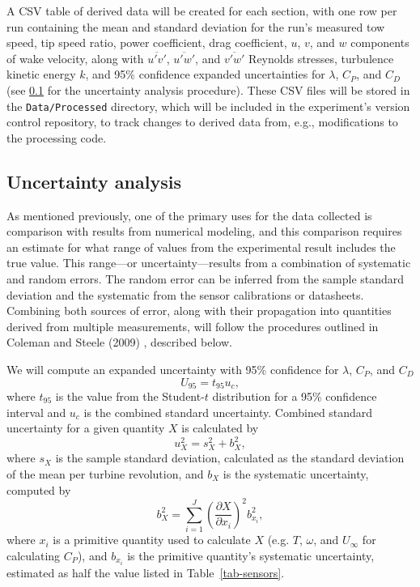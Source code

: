 \documentclass[12pt,letterpaper]{scrreprt}
\begin{document}
A CSV table of derived data will be created for each section, with one row per
run containing the mean and standard deviation for the run's measured tow speed,
tip speed ratio, power coefficient, drag coefficient, $u$, $v$, and $w$
components of wake velocity, along with $\overline{u'v'}$, $\overline{u'w'}$,
and $\overline{v'w'}$ Reynolds stresses, turbulence kinetic energy $k$, and 95\%
confidence expanded uncertainties for $\lambda$, $C_P$, and $C_D$ (see
\ref{heading-uncertainty} for the uncertainty analysis procedure). These CSV
files will be stored in the \texttt{Data/Processed} directory, which will be
included in the experiment's version control repository, to track changes to
derived data from, e.g., modifications to the processing code.

\subsection{Uncertainty analysis}\label{heading-uncertainty}

As mentioned previously, one of the primary uses for the data collected is
comparison with results from numerical modeling, and this comparison requires an
estimate for what range of values from the experimental result includes the true
value. This range---or uncertainty---results from a combination of systematic
and random errors. The random error can be inferred from the sample standard
deviation and the systematic from the sensor calibrations or datasheets.
Combining both sources of error, along with their propagation into quantities
derived from multiple measurements, will follow the procedures outlined in
Coleman and Steele (2009) \cite{ColemanSteele}, described below.

We will compute an expanded uncertainty with 95\% confidence for $\lambda$,
$C_P$, and $C_D$
\begin{equation}
U_{95} = t_{95} u_c,
\end{equation}
where $t_{95}$ is the value from the Student-$t$ distribution for a 95\%
confidence interval and $u_c$ is the combined standard uncertainty. Combined
standard uncertainty for a given quantity $X$ is calculated by
\begin{equation}
u_X^2 = s_X^2 + b_X^2,
\end{equation}
where $s_X$ is the sample standard deviation, calculated as the standard
deviation of the mean per turbine revolution, and $b_X$ is the systematic
uncertainty, computed by
\begin{equation}
b_{X}^2 = \sum_{i=1}^J \left( \frac{\partial X}{\partial x_i} \right)^2 b_{x_i}^2,
\end{equation}
where $x_i$ is a primitive quantity used to calculate $X$ (e.g. $T$, $\omega$,
and $U_\infty$ for calculating $C_P$), and $b_{x_i}$ is the primitive quantity's
systematic uncertainty, estimated as half the value listed in
Table~\ref{tab-sensors}.
\end{document}

